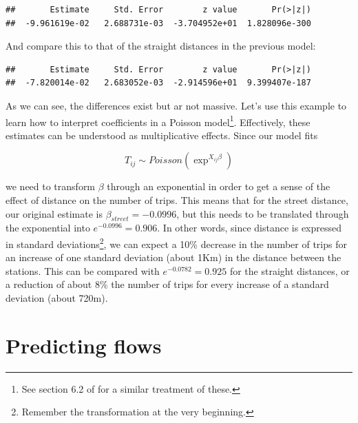 \documentclass[
]{book}
\newenvironment{Shaded}{\begin{snugshade}}{\end{snugshade}}
\newcommand{\FunctionTok}[1]{\textcolor[rgb]{0.00,0.00,0.00}{#1}}
\newcommand{\NormalTok}[1]{#1}
\newcommand{\SpecialCharTok}[1]{\textcolor[rgb]{0.00,0.00,0.00}{#1}}
\newcommand{\StringTok}[1]{\textcolor[rgb]{0.31,0.60,0.02}{#1}}
\begin{document}
\begin{verbatim}
##       Estimate     Std. Error        z value       Pr(>|z|) 
##  -9.961619e-02   2.688731e-03  -3.704952e+01  1.828096e-300
\end{verbatim}

And compare this to that of the straight distances in the previous model:

\begin{Shaded}
\end{Shaded}

\begin{verbatim}
##       Estimate     Std. Error        z value       Pr(>|z|) 
##  -7.820014e-02   2.683052e-03  -2.914596e+01  9.399407e-187
\end{verbatim}

As we can see, the differences exist but ar not massive. Let's use this example to learn how to interpret coefficients in a Poisson model\footnote{See section 6.2 of \citet{gelman2006data} for a similar treatment of these.}. Effectively, these estimates can be understood as multiplicative effects. Since our model fits

\[
T_{ij} \sim Poisson (\exp^{X_{ij}\beta})
\]

we need to transform \(\beta\) through an exponential in order to get a sense of the effect of distance on the number of trips. This means that for the street distance, our original estimate is \(\beta_{street} = -0.0996\), but this needs to be translated through the exponential into \(e^{-0.0996} = 0.906\). In other words, since distance is expressed in standard deviations\footnote{Remember the transformation at the very beginning.}, we can expect a 10\% decrease in the number of trips for an increase of one standard deviation (about 1Km) in the distance between the stations. This can be compared with \(e^{-0.0782} = 0.925\) for the straight distances, or a reduction of about 8\% the number of trips for every increase of a standard deviation (about 720m).

\hypertarget{predicting-flows}{%
\section{Predicting flows}\label{predicting-flows}}
\end{document}
